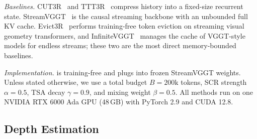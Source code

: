 \textit{Baselines.}
CUT3R~\cite{wang2025cut3r} and TTT3R~\cite{chen2025ttt3r} compress history into a fixed-size recurrent state. StreamVGGT~\cite{zhuo2025streamvggt} is the causal streaming backbone with an unbounded full KV cache. Evict3R~\cite{mahdi2025evict3r} performs training-free token eviction on streaming visual geometry transformers, and InfiniteVGGT~\cite{yuan2026infinitevggt} manages the cache of VGGT-style models for endless streams; these two are the most direct memory-bounded baselines.

\textit{Implementation.}
\method{} is training-free and plugs into frozen StreamVGGT weights. Unless stated otherwise, we use a total budget $B{=}200\mathrm{k}$ tokens, SCR strength $\alpha=0.5$, TSA decay $\gamma=0.9$, and mixing weight $\beta=0.5$.
All methods run on one NVIDIA RTX 6000 Ada GPU (48\,GB) with PyTorch 2.9 and CUDA 12.8.

\subsection{Depth Estimation}
\label{sec:exp-depth}

